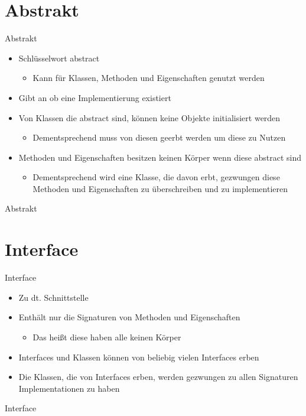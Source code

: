 \section{Abstrakt}
\begin{frame}{Abstrakt}
	\begin{itemize}
		\item Schlüsselwort \alert{abstract}
		\begin{itemize}
			\item Kann für Klassen, Methoden und Eigenschaften genutzt werden		
		\end{itemize}
		\item Gibt an ob eine Implementierung existiert
		\item Von Klassen die \alert{abstract} sind, können keine Objekte initialisiert werden
		\begin{itemize}
			\item Dementsprechend muss von diesen geerbt werden um diese zu Nutzen
		\end{itemize}
		\item Methoden und Eigenschaften besitzen keinen Körper wenn diese \alert{abstract} sind
		\begin{itemize}
			\item Dementsprechend wird eine Klasse, die davon erbt, gezwungen diese Methoden und Eigenschaften zu überschreiben und zu implementieren
		\end{itemize}
	\end{itemize}
\end{frame}

\begin{frame}{Abstrakt}
	
\end{frame}

\section{Interface}
\begin{frame}{Interface}
	\begin{itemize}
		\item Zu dt. Schnittstelle
		\item Enthält nur die \alert{Signaturen} von Methoden und Eigenschaften
		\begin{itemize}
			\item Das heißt diese haben alle keinen Körper
		\end{itemize}
		\item Interfaces und Klassen können von beliebig vielen Interfaces erben
		\item Die Klassen, die von Interfaces erben, werden gezwungen zu allen Signaturen Implementationen zu haben
	\end{itemize}
\end{frame}

\begin{frame}{Interface}
	
\end{frame}


